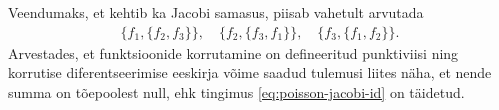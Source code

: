 Veendumaks, et kehtib ka Jacobi samasus, piisab vahetult arvutada
\begin{align*}
    \{f_1, \{f_2, f_3\}\}, \quad
    \{f_2, \{f_3, f_1\}\}, \quad
    \{f_3, \{f_1, f_2\}\}.
\end{align*}
Arvestades, et funktsioonide korrutamine on defineeritud punktiviisi ning
korrutise diferentseerimise eeskirja võime saadud tulemusi liites näha, et
nende summa on tõepoolest null, ehk tingimus \eqref{eq:poisson-jacobi-id}
on täidetud.

